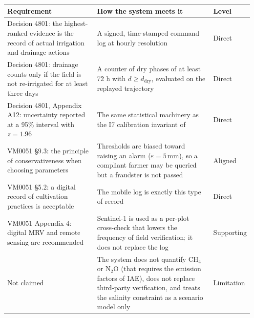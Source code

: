 
\begin{tabular}{@{}p{4.5cm}p{10.1cm}p{2.3cm}@{}}
\toprule
Requirement & How the system meets it & Level \\
\midrule
Decision 4801: the highest-ranked evidence is the record of actual irrigation and drainage actions &A signed, time-stamped command log at hourly resolution &Direct \\
Decision 4801: drainage counts only if the field is not re-irrigated for at least three days &A counter of dry phases of at least 72 h with $d\ge d_{\mathrm{dry}}$, evaluated on the replayed trajectory &Direct \\
Decision 4801, Appendix A12: uncertainty reported at a 95\% interval with $z=1.96$ &The same statistical machinery as the I7 calibration invariant of~\cite{twingate2026} &Direct \\
VM0051 \S 9.3: the principle of conservativeness when choosing parameters &Thresholds are biased toward raising an alarm ($\varepsilon=5$\,mm), so a compliant farmer may be queried but a fraudster is not passed &Aligned \\
VM0051 \S 5.2: a digital record of cultivation practices is acceptable &The mobile log is exactly this type of record &Direct \\
VM0051 Appendix 4: digital MRV and remote sensing are recommended &Sentinel-1 is used as a per-plot cross-check that lowers the frequency of field verification; it does not replace the log &Supporting \\
Not claimed &The system does not quantify CH$_4$ or N$_2$O (that requires the emission factors of IAE), does not replace third-party verification, and treats the salinity constraint as a scenario model only &Limitation \\
\bottomrule
\end{tabular}
